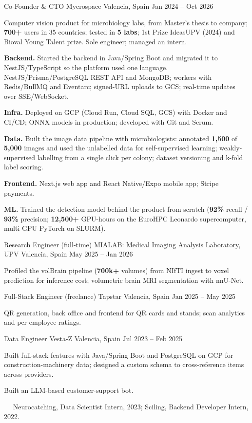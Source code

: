 \begin{cventries}
\cvkeep
\cventry
    {Co-Founder \& CTO}
    {Mycrospace}
    {Valencia, Spain}
    {Jan 2024 – Oct 2026}
    {
\begin{cvitems}
\item {Computer vision product for microbiology labs, from Master's thesis to company; \textbf{700+} users in 35 countries; tested in \textbf{5 labs}; 1st Prize IdeasUPV (2024) and Bioval Young Talent prize. Sole engineer; managed an intern.}
\item {\textbf{Backend.} Started the backend in Java/Spring Boot and migrated it to NestJS/TypeScript so the platform used one language. NestJS/Prisma/PostgreSQL REST API and MongoDB; workers with Redis/BullMQ and Eventarc; signed-URL uploads to GCS; real-time updates over SSE/WebSocket.}
\item {\textbf{Infra.} Deployed on GCP (Cloud Run, Cloud SQL, GCS) with Docker and CI/CD; ONNX models in production; developed with Git and Scrum.}
\item {\textbf{Data.} Built the image data pipeline with microbiologists: annotated \textbf{1,500} of \textbf{5,000} images and used the unlabelled data for self-supervised learning; weakly-supervised labelling from a single click per colony; dataset versioning and k-fold label scoring.}
\item {\textbf{Frontend.} Next.js web app and React Native/Expo mobile app; Stripe payments.}
\item {\textbf{ML.} Trained the detection model behind the product from scratch (\textbf{92\%} recall / \textbf{93\%} precision; \textbf{12,500+} GPU-hours on the EuroHPC Leonardo supercomputer, multi-GPU PyTorch on SLURM).}
\end{cvitems}
    }
\cvkeep
\cventry
    {Research Engineer (full-time)}
    {MIALAB: Medical Imaging Analysis Laboratory, UPV}
    {Valencia, Spain}
    {May 2025 – Jan 2026}
    {
\begin{cvitems}
\item {Profiled the volBrain pipeline (\textbf{700k+} volumes) from NIfTI ingest to voxel prediction for inference cost; volumetric brain MRI segmentation with nnU-Net.}
\end{cvitems}
    }
\cvkeep
\cventry
    {Full-Stack Engineer (freelance)}
    {Tapstar}
    {Valencia, Spain}
    {Jan 2025 – May 2025}
    {
\begin{cvitems}
\item {QR generation, back office and frontend for QR cards and stands; scan analytics and per-employee ratings.}
\end{cvitems}
    }
\cvkeep
\cventry
    {Data Engineer}
    {Vesta-Z}
    {Valencia, Spain}
    {Jul 2023 – Feb 2025}
    {
\begin{cvitems}
\item {Built full-stack features with Java/Spring Boot and PostgreSQL on GCP for construction-machinery data; designed a custom schema to cross-reference items across providers.}
\item {Built an LLM-based customer-support bot.}
\end{cvitems}
    }
\end{cventries}
\vspace{0.4mm}
~~{\fontsize{8pt}{1em}\bodyfontlight\color{text} Neurocatching, Data Scientist Intern, 2023; Sciling, Backend Developer Intern, 2022.}\par
